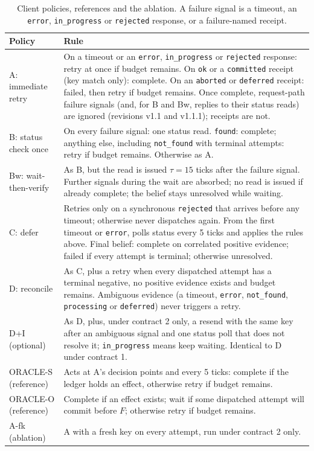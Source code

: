 \documentclass[11pt]{article}
\newcommand{\code}[1]{\texttt{#1}}
\begin{document}
\begin{table}[!htbp]
\centering
\footnotesize
\caption{Client policies, references and the ablation. A failure signal is a timeout, an \code{error}, \code{in\_progress} or \code{rejected} response, or a failure-named receipt.}
\label{tab:policies}
\begin{tabular}{@{}L{2.6cm}L{13.0cm}@{}}
\toprule
Policy & Rule \\
\midrule
A: immediate retry & On a timeout or an \code{error}, \code{in\_progress} or \code{rejected} response: retry at once if budget remains. On \code{ok} or a \code{committed} receipt (key match only): complete. On an \code{aborted} or \code{deferred} receipt: failed, then retry if budget remains. Once complete, request-path failure signals (and, for B and Bw, replies to their status reads) are ignored (revisions v1.1 and v1.1.1); receipts are not. \\
B: status check once & On every failure signal: one status read. \code{found}: complete; anything else, including \code{not\_found} with terminal attempts: retry if budget remains. Otherwise as A. \\
Bw: wait-then-verify & As B, but the read is issued $\tau=15$ ticks after the failure signal. Further signals during the wait are absorbed; no read is issued if already complete; the belief stays unresolved while waiting. \\
C: defer & Retries only on a synchronous \code{rejected} that arrives before any timeout; otherwise never dispatches again. From the first timeout or \code{error}, polls status every 5 ticks and applies the rules above. Final belief: complete on correlated positive evidence; failed if every attempt is terminal; otherwise unresolved. \\
D: reconcile & As C, plus a retry when every dispatched attempt has a terminal negative, no positive evidence exists and budget remains. Ambiguous evidence (a timeout, \code{error}, \code{not\_found}, \code{processing} or \code{deferred}) never triggers a retry. \\
D+I (optional) & As D, plus, under contract 2 only, a resend with the same key after an ambiguous signal and one status poll that does not resolve it; \code{in\_progress} means keep waiting. Identical to D under contract 1. \\
\midrule
ORACLE-S (reference) & Acts at A's decision points and every 5 ticks: complete if the ledger holds an effect, otherwise retry if budget remains. \\
ORACLE-O (reference) & Complete if an effect exists; wait if some dispatched attempt will commit before $F$; otherwise retry if budget remains. \\
A-fk (ablation) & A with a fresh key on every attempt, run under contract 2 only. \\
\bottomrule
\end{tabular}
\end{table}
\end{document}
